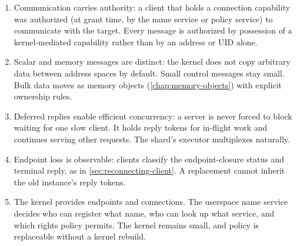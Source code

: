 \begin{enumerate}
    \item Communication carries authority: a client that
        holds a connection capability was authorized (at grant time, by the name
        service or policy service) to communicate with the target. Every message
        is authorized by possession of a kernel-mediated capability rather than
        by an address or UID alone.

    \item Scalar and memory messages are distinct: the kernel does not
        copy arbitrary data between address spaces by default. Small control
        messages stay small. Bulk data moves as memory objects
        (\autoref{chap:memory-objects}) with
        explicit ownership rules.

    \item Deferred replies enable efficient concurrency: a server is never
        forced to block waiting for one slow client. It holds reply tokens for
        in-flight work and continues serving other requests. The shard's executor
        multiplexes naturally.

    \item Endpoint loss is observable: clients classify the endpoint-closure
        status and terminal reply, as in \autoref{sec:reconnecting-client}.
        A replacement cannot inherit the old instance's reply tokens.

    \item The kernel provides endpoints and connections. The userspace name
        service decides who can register what name,
        who can look up what service, and which rights policy permits. The
        kernel remains small, and policy is replaceable without a kernel rebuild.
\end{enumerate}

\endinput
